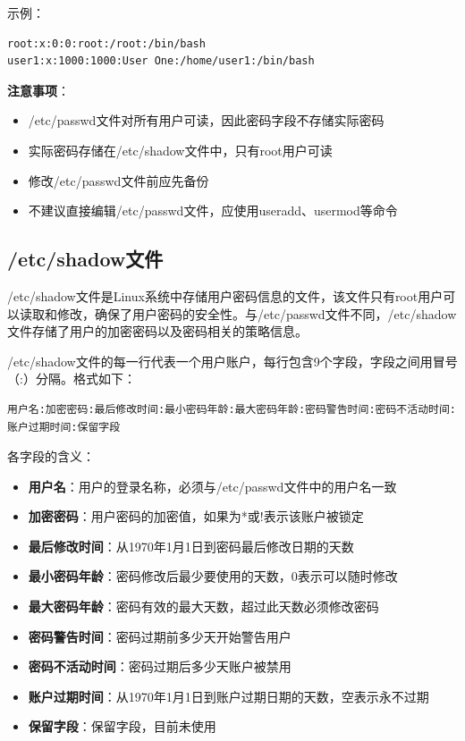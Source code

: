 \documentclass[12pt,UTF8]{ctexbook}
\begin{document}
示例：

\begin{verbatim}
root:x:0:0:root:/root:/bin/bash
user1:x:1000:1000:User One:/home/user1:/bin/bash
\end{verbatim}

\textbf{注意事项}：
\begin{itemize}
    \item /etc/passwd文件对所有用户可读，因此密码字段不存储实际密码
    \item 实际密码存储在/etc/shadow文件中，只有root用户可读
    \item 修改/etc/passwd文件前应先备份
    \item 不建议直接编辑/etc/passwd文件，应使用useradd、usermod等命令
\end{itemize}

\subsection{/etc/shadow文件}

/etc/shadow文件是Linux系统中存储用户密码信息的文件，该文件只有root用户可以读取和修改，确保了用户密码的安全性。与/etc/passwd文件不同，/etc/shadow文件存储了用户的加密密码以及密码相关的策略信息。

/etc/shadow文件的每一行代表一个用户账户，每行包含9个字段，字段之间用冒号（:）分隔。格式如下：

\begin{verbatim}
用户名:加密密码:最后修改时间:最小密码年龄:最大密码年龄:密码警告时间:密码不活动时间:账户过期时间:保留字段
\end{verbatim}

各字段的含义：

\begin{itemize}
    \item \textbf{用户名}：用户的登录名称，必须与/etc/passwd文件中的用户名一致
    \item \textbf{加密密码}：用户密码的加密值，如果为*或!表示该账户被锁定
    \item \textbf{最后修改时间}：从1970年1月1日到密码最后修改日期的天数
    \item \textbf{最小密码年龄}：密码修改后最少要使用的天数，0表示可以随时修改
    \item \textbf{最大密码年龄}：密码有效的最大天数，超过此天数必须修改密码
    \item \textbf{密码警告时间}：密码过期前多少天开始警告用户
    \item \textbf{密码不活动时间}：密码过期后多少天账户被禁用
    \item \textbf{账户过期时间}：从1970年1月1日到账户过期日期的天数，空表示永不过期
    \item \textbf{保留字段}：保留字段，目前未使用
\end{itemize}
\end{document}
